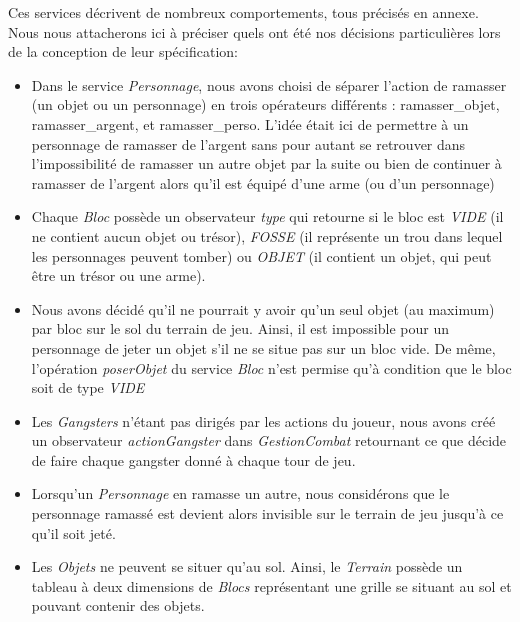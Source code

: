 \documentclass[a4paper, 11pt, notitlepage]{article}
\begin{document}
Ces services décrivent de nombreux comportements, tous précisés en annexe. Nous nous attacherons ici à préciser quels ont été nos décisions particulières lors de la conception de leur spécification: \\

\begin{itemize}

\item Dans le service \emph{Personnage}, nous avons choisi de séparer l'action de ramasser (un objet ou un personnage) en trois opérateurs différents : ramasser\_objet, ramasser\_argent, et ramasser\_perso. L'idée était ici de permettre à un personnage de ramasser de l'argent sans pour autant se retrouver dans l'impossibilité de ramasser un autre objet par la suite ou bien de continuer à ramasser de l'argent alors qu'il est équipé d'une arme (ou d'un personnage) \\

\item Chaque \emph{Bloc} possède un observateur \emph{type} qui retourne si le bloc est \emph{VIDE} (il ne contient aucun objet ou trésor), \emph{FOSSE} (il représente un trou dans lequel les personnages peuvent tomber) ou \emph{OBJET} (il contient un objet, qui peut être un trésor ou une arme).  \\

\item Nous avons décidé qu'il ne pourrait y avoir qu'un seul objet (au maximum) par bloc sur le sol du terrain de jeu. Ainsi, il est impossible pour un personnage de jeter un objet s'il ne se situe pas sur un bloc vide. De même, l'opération \emph{poserObjet} du service \emph{Bloc} n'est permise qu'à condition que le bloc soit de type \emph{VIDE} \\

\item Les \emph{Gangsters} n'étant pas dirigés par les actions du joueur, nous avons créé un observateur \emph{actionGangster} dans \emph{GestionCombat} retournant ce que décide de faire chaque gangster donné à chaque tour de jeu.  \\

\item Lorsqu'un \emph{Personnage} en ramasse un autre, nous considérons que le personnage ramassé est devient alors invisible sur le terrain de jeu jusqu'à ce qu'il soit jeté. \\ 

\item Les \emph{Objets} ne peuvent se situer qu'au sol. Ainsi, le \emph{Terrain} possède un tableau à deux dimensions de \emph{Blocs} représentant une grille se situant au sol et pouvant contenir des objets. \\


\end{itemize}
\end{document}
